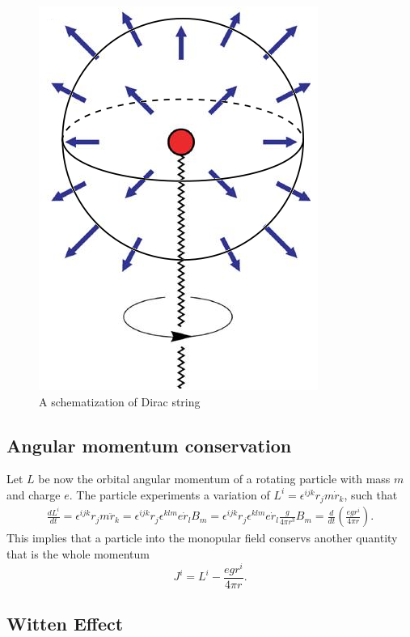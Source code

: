 \documentclass[main.tex]{subfiles}
\begin{document}
\begin{figure}[h]
\centering
\includegraphics[scale=0.3]{DiracMon.png}
\caption{A schematization of Dirac string}
\label{fig-DirMon}
\end{figure}

\subsection{Angular momentum conservation}
Let $L$ be now the orbital angular momentum of a rotating particle with mass $m$ and charge $e$. The particle experiments a variation of $L^i=\epsilon^{ijk}r_jm\dot r_k$, such that
\begin{align}
\frac{dL^i}{dt}=\epsilon^{ijk}r_jm\ddot r_k=\epsilon^{ijk}r_j\epsilon^{klm}e\dot r_lB_m=\epsilon^{ijk}r_j\epsilon^{klm}e\dot r_l\frac{g}{4\pi r^3}B_m=\frac{d}{dt}\left(\frac{egr^i}{4\pi r}\right).
\end{align}
This implies that a particle into the monopular field conservs another quantity that is the whole momentum
\begin{equation}
J^i=L^i-\frac{egr^i}{4\pi r}.
\end{equation}
\subsection{Witten Effect}
\end{document}
